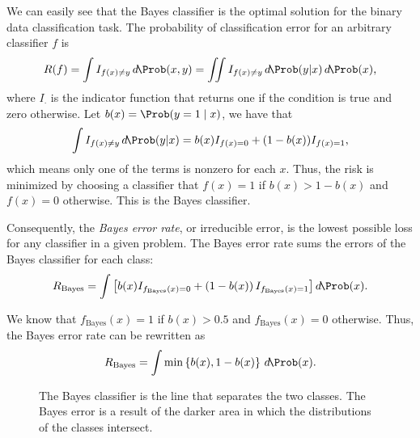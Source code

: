 We can easily see that the Bayes classifier is the optimal solution for the binary data
classification task.  The probability of classification error for an arbitrary classifier
$f$ is
\begin{equation*}
  R(f) = \int I_{f(x) \neq y}\, d\!\Prob(x, y) =
    \iint I_{f(x) \neq y}\, d\!\Prob(y | x)\, d\!\Prob(x)\text{,}
\end{equation*}
where $I_{\cdot}$ is the indicator function that returns one if the condition is
true and zero otherwise.  Let $b(x) = \Prob(y = 1 \mid x)$, we have that
\[
  \int I_{f(x) \neq y}\, d\!\Prob(y | x) =
    b(x) I_{f(x) = 0} + (1 - b(x)) I_{f(x) = 1}\text{,}
\]
which means only one of the terms is nonzero for each $x$.  Thus, the risk is minimized by choosing
a classifier that $f(x) = 1$ if $b(x) > 1 - b(x)$ and $f(x) = 0$ otherwise.  This is the
Bayes classifier.

Consequently, the \emph{Bayes error rate}, or irreducible error, is the lowest possible loss for any
classifier in a given problem.  The Bayes error rate sums the errors of the
Bayes classifier for each class:
\begin{equation*}
  R_\text{Bayes} = \int \left[
    b(x) I_{f_\text{Bayes}(x) = 0} +
    \left(1 - b(x)\right) I_{f_\text{Bayes}(x) = 1}
  \right] d\!\Prob(x)\text{.}
\end{equation*}

We know that $f_\text{Bayes}(x) = 1$ if $b(x) > 0.5$ and $f_\text{Bayes}(x) = 0$ otherwise.
Thus, the Bayes error rate can be rewritten as
\begin{equation*}
  R_\text{Bayes} = \int \min\left\{ b(x), 1 - b(x) \right\}\, d\!\Prob(x)\text{.}
\end{equation*}

\begin{figure}
  \centering
  \caption{
  The Bayes classifier is the line that separates the two classes.  The Bayes error is a
  result of the darker area in which the distributions of the classes intersect.
  }
  \label{fig:bayes-classifier}
\end{figure}

